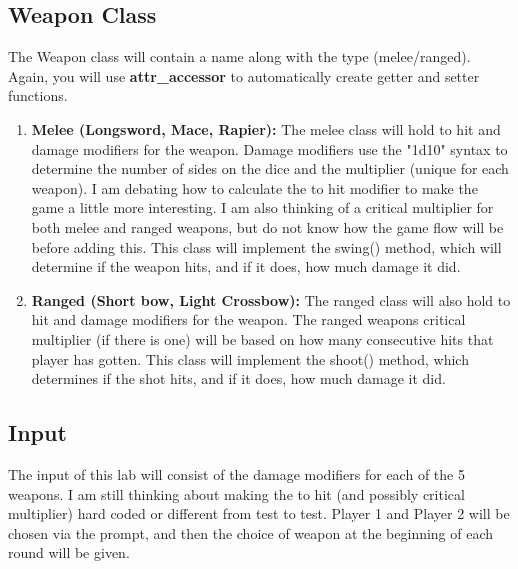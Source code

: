 \documentclass{article}
\begin{document}
\subsection*{Weapon Class}
The Weapon class will contain a name along with the type (melee/ranged). Again, you will use \textbf{attr\_accessor} to automatically create getter and setter functions.

\begin{enumerate}

\item \textbf{Melee (Longsword, Mace, Rapier):} The melee class will hold to hit and damage modifiers for the weapon. Damage modifiers use the "1d10" syntax to determine the number of sides on the dice and the multiplier (unique for each weapon). I am debating how to calculate the to hit modifier to make the game a little more interesting. I am also thinking of a critical multiplier for both melee and ranged weapons, but do not know how the game flow will be before adding this. This class will implement the swing() method, which will determine if the weapon hits, and if it does, how much damage it did. 

\item \textbf{Ranged (Short bow, Light Crossbow):} The ranged class will also hold to hit and damage modifiers for the weapon. The ranged weapons critical multiplier (if there is one) will be based on how many consecutive hits that player has gotten. This class will implement the shoot() method, which determines if the shot hits, and if it does, how much damage it did.

\end{enumerate}

\subsection*{Input}
The input of this lab will consist of the damage modifiers for each of the 5 weapons. I am still thinking about making the to hit (and possibly critical multiplier) hard coded or different from test to test. Player 1 and Player 2 will be chosen via the prompt, and then the choice of weapon at the beginning of each round will be given.
\end{document}
